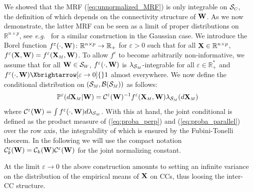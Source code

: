 We showed that the MRF (\ref{eq:unnormalized_MRF}) is only integrable on $\mathcal{S}_{\scaleto{C}{4pt}}$, the definition of which depends on the connectivity structure of $\mathbf{W}$. As we now demonstrate, the latter MRF can be seen as a limit of proper distributions on $\mathbb{R}^{n \times p}$, see \textit{e.g.}\ \cite{rue2005gaussian} for a similar construction in the Gaussian case. 
We introduce the Borel function $f^{\varepsilon}(\cdot, \mathbf{W}) \colon \mathbb{R}^{n \times p} \to \mathbb{R}_+$ for $\varepsilon > 0$ such that for all $\mathbf{X} \in \mathbb{R}^{n \times p}$, $f^{\varepsilon}(\Xb, \Wb) = f^{\varepsilon}(\Xb_{\scaleto{M}{4pt}}, \Wb)$. To allow $f^{\varepsilon}$ to become arbitrarily non-informative, we assume that for all $\Wb \in \mathcal{S}_{\scaleto{W}{4pt}}$, $f^\varepsilon(\cdot, \mathbf{W})$ is $\lambda_{\scaleto{\mathcal{S}_{\scaleto{M}{3pt}}}{6pt}}$-integrable for all $\varepsilon \in \mathbb{R}^*_+$ and $f^{\varepsilon}(\cdot, \Wb) \Xbrightarrow[\varepsilon \to 0]{} 1$ almost everywhere.
We now define the conditional distribution on $(\mathcal{S}_{\scaleto{M}{4pt}}, \mathcal{B}(\mathcal{S}_{\scaleto{M}{4pt}}))$ as follows:
\begin{align}\label{eq:proba_parallel}
     \mathbb{P}^{\varepsilon}(d\Xb_{\scaleto{M}{4pt}}| \Wb) = \mathcal{C}^{\varepsilon}(\Wb)^{-1} f^{\varepsilon}(\Xb_{\scaleto{M}{4pt}}, \Wb) \lambda_{\mathcal{S}_{\scaleto{M}{3pt}}}(d\Xb_{\scaleto{M}{4pt}})
\end{align}
where $\mathcal{C}^{\varepsilon}(\Wb) = \int f^{\varepsilon}(\cdot, \Wb) d\lambda_{\mathcal{S}_{\scaleto{M}{3pt}}}$.
With this at hand, the joint conditional is defined as the product measure of (\ref{eq:proba_perp}) and (\ref{eq:proba_parallel}) over the row axis, the integrability of which is ensured by the Fubini-Tonelli theorem. In the following we will use the compact notation $\mathcal{C}^{\varepsilon}_k(\mathbf{W}) = \mathcal{C}_k(\mathbf{W})\mathcal{C}^{\varepsilon}(\mathbf{W})$ for the joint normalizing constant.

\begin{remark}
At the limit $\varepsilon \to 0$ the above construction amounts to setting an infinite variance on the distribution of the empirical means of $\mathbf{X}$ on CCs, thus loosing the inter-CC structure. 
\end{remark}

